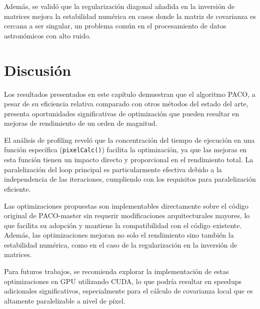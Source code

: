 Además, se validó que la regularización diagonal añadida en la inversión de matrices mejora la estabilidad numérica en casos donde la matriz de covarianza es cercana a ser singular, un problema común en el procesamiento de datos astronómicos con alto ruido.

\section{Discusión}

Los resultados presentados en este capítulo demuestran que el algoritmo PACO, a pesar de su eficiencia relativa comparado con otros métodos del estado del arte, presenta oportunidades significativas de optimización que pueden resultar en mejoras de rendimiento de un orden de magnitud.

El análisis de profiling reveló que la concentración del tiempo de ejecución en una función específica (\texttt{pixelCalc()}) facilita la optimización, ya que las mejoras en esta función tienen un impacto directo y proporcional en el rendimiento total. La paralelización del loop principal es particularmente efectiva debido a la independencia de las iteraciones, cumpliendo con los requisitos para paralelización eficiente.

Las optimizaciones propuestas son implementables directamente sobre el código original de PACO-master sin requerir modificaciones arquitecturales mayores, lo que facilita su adopción y mantiene la compatibilidad con el código existente. Además, las optimizaciones mejoran no solo el rendimiento sino también la estabilidad numérica, como en el caso de la regularización en la inversión de matrices.

Para futuros trabajos, se recomienda explorar la implementación de estas optimizaciones en GPU utilizando CUDA, lo que podría resultar en speedups adicionales significativos, especialmente para el cálculo de covarianza local que es altamente paralelizable a nivel de píxel.
